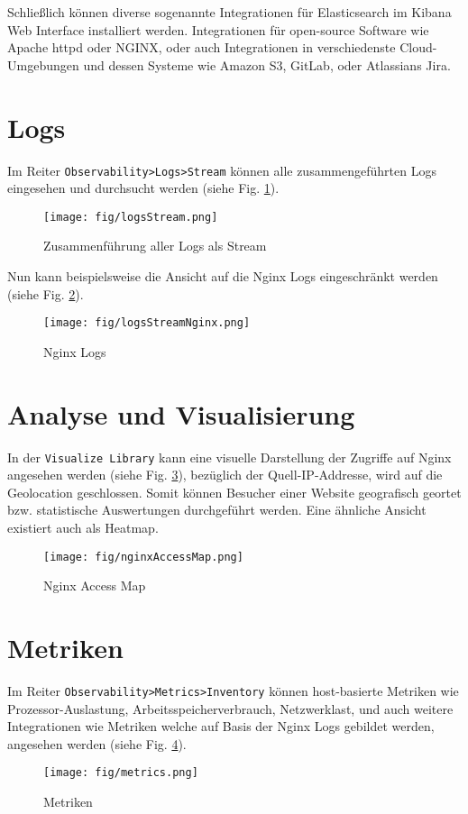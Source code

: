 Schließlich können diverse sogenannte Integrationen \cite{elasticIntegrationsWebsite}
für Elasticsearch im Kibana Web Interface installiert werden.
Integrationen für open-source Software wie Apache httpd oder NGINX,
oder auch Integrationen in verschiedenste Cloud-Umgebungen und dessen
Systeme wie Amazon S3, GitLab, oder Atlassians Jira.

\section{Logs}
Im Reiter \verb|Observability>Logs>Stream| können alle zusammengeführten
Logs eingesehen und durchsucht werden (siehe Fig. \ref{fig:logsStream}).

\begin{figure}[h]
	\centering
	\texttt{[image: fig/logsStream.png]}
	\caption{Zusammenführung aller Logs als Stream}
	\label{fig:logsStream}
\end{figure}

Nun kann beispielsweise die Ansicht auf die Nginx Logs eingeschränkt werden
(siehe Fig. \ref{fig:logsStreamNginx}).

\begin{figure}[h]
	\centering
	\texttt{[image: fig/logsStreamNginx.png]}
	\caption{Nginx Logs}
	\label{fig:logsStreamNginx}
\end{figure}

\section{Analyse und Visualisierung}
In der \verb|Visualize Library| kann eine visuelle Darstellung
der Zugriffe auf Nginx angesehen werden (siehe Fig. \ref{fig:nginxAccessMap}),
bezüglich der Quell-IP-Addresse,
wird auf die Geolocation geschlossen. Somit können Besucher einer Website
geografisch geortet bzw. statistische Auswertungen durchgeführt werden.
Eine ähnliche Ansicht existiert auch als Heatmap.

\begin{figure}[h]
	\centering
	\texttt{[image: fig/nginxAccessMap.png]}
	\caption{Nginx Access Map}
	\label{fig:nginxAccessMap}
\end{figure}

\section{Metriken}
Im Reiter \verb|Observability>Metrics>Inventory| können host-basierte
Metriken wie Prozessor-Auslastung, Arbeitsspeicherverbrauch,
Netzwerklast, und auch weitere Integrationen wie Metriken
welche auf Basis der Nginx Logs gebildet werden, angesehen werden
(siehe Fig. \ref{fig:metrics}).

\begin{figure}[h]
	\centering
	\texttt{[image: fig/metrics.png]}
	\caption{Metriken}
	\label{fig:metrics}
\end{figure}
